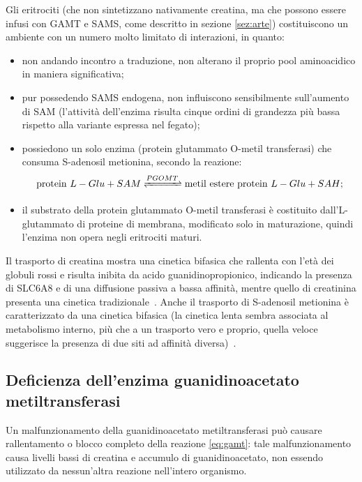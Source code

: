 		Gli eritrociti (che non sintetizzano nativamente creatina, ma che possono essere infusi con GAMT e SAMS, come descritto in sezione \ref{sez:arte}) costituiscono un ambiente con un numero molto limitato di interazioni, in quanto:
		\begin{itemize}
			\item non andando incontro a traduzione, non alterano il proprio pool aminoacidico in maniera significativa;
			\item pur possedendo SAMS endogena, non influiscono sensibilmente sull'aumento di SAM (l'attivit\`a dell'enzima risulta cinque ordini di grandezza pi\`u bassa rispetto alla variante espressa nel fegato);
			\item possiedono un solo enzima (protein glutammato O-metil transferasi) che consuma S-adenosil metionina, secondo la reazione:
			\begin{equation}
				\text{protein }L-Glu + SAM \xrightleftharpoons{PGOMT} \text{metil estere protein }L-Glu + SAH;
			\end{equation}
			\item il substrato della protein glutammato O-metil transferasi \`e costituito dall'L-glutammato di proteine di membrana, modificato solo in maturazione, quindi l'enzima non opera negli eritrociti maturi.
		\end{itemize}
		
		Il trasporto di creatina mostra una cinetica bifasica che rallenta con l'et\`a dei globuli rossi e risulta inibita da acido guanidinopropionico, indicando la presenza di SLC6A8 e di una diffusione passiva a bassa affinit\`a, mentre quello di creatinina presenta una cinetica tradizionale~\cite{ku1980creatine}.
		Anche il trasporto di S-adenosil metionina \`e caratterizzato da una cinetica bifasica (la cinetica lenta sembra associata al metabolismo interno, pi\`u che a un trasporto vero e proprio, quella veloce suggerisce la presenza di due siti ad affinit\`a diversa)~\cite{pezzoli1978uptake,stramentinoli1978uptake}.
		
		\subsection{Deficienza dell'enzima guanidinoacetato metiltransferasi}
		Un malfunzionamento della guanidinoacetato metiltransferasi pu\`o causare rallentamento o blocco completo della reazione \ref{eq:gamt}: tale malfunzionamento causa livelli bassi di creatina e accumulo di guanidinoacetato, non essendo utilizzato da nessun'altra reazione nell'intero organismo.
		
